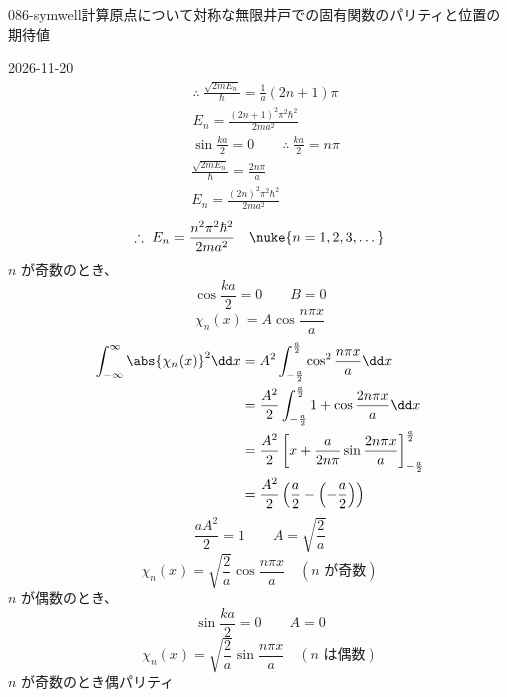 \documentclass[uplatex,dvipdfmx,a4paper,11pt]{jsarticle}
\begin{document}
\begin{mondai}{086-symwell}{計算}{原点について対称な無限井戸での固有関数のパリティと位置の期待値}
\begin{kotaeutsushi}{2026-11-20}
\begin{align*}
&\therefore\ \frac{\sqrt{2mE_{n}}}{\hbar}=\frac{1}{a}(2n+1)\pi\\
&E_{n}=\frac{(2n+1)^{2}\pi^{2}\hbar^{2}}{2ma^{2}}
\end{align*}
\begin{align*}
&\sin\frac{ka}{2}=0\qquad\therefore\ \frac{ka}{2}=n\pi\\
&\frac{\sqrt{2mE_{n}}}{\hbar}=\frac{2n\pi}{a}\\
&E_{n}=\frac{(2n)^{2}\pi^{2}\hbar^{2}}{2ma^{2}}
\end{align*}
\[ \therefore\ E_{n}=\frac{n^{2}\pi^{2}\hbar^{2}}{2ma^{2}}\quad\nuke{n=1,2,3,\dots} \]
$n$ が奇数のとき、
\[ \cos\frac{ka}{2}=0\qquad B=0 \]
\[ \chi_{n}(x)=A\cos\frac{n\pi x}{a} \]
\begin{align*}
\int_{-\infty}^{\infty}\abs{\chi_{n}(x)}^{2}\dd x&=A^{2}\int_{-\frac{a}{2}}^{\frac{a}{2}}\cos^{2}\frac{n\pi x}{a}\dd x\\
&=\frac{A^{2}}{2}\int_{-\frac{a}{2}}^{\frac{a}{2}}1+\cos\frac{2n\pi x}{a}\dd x\\
&=\frac{A^{2}}{2}\left[x+\frac{a}{2n\pi}\sin\frac{2n\pi x}{a}\right]_{-\frac{a}{2}}^{\frac{a}{2}}\\
&=\frac{A^{2}}{2}\left(\frac{a}{2}-\left(-\frac{a}{2}\right)\right)
\end{align*}
\[ \frac{aA^{2}}{2}=1\qquad A=\sqrt{\frac{2}{a}} \]
\[ \chi_{n}(x)=\sqrt{\frac{2}{a}}\cos\frac{n\pi x}{a}\quad(\text{$n$ が奇数}) \]
$n$ が偶数のとき、
\[ \sin\frac{ka}{2}=0\qquad A=0 \]
\[ \chi_{n}(x)=\sqrt{\frac{2}{a}}\sin\frac{n\pi x}{a}\quad(\text{$n$ は偶数}) \]
$n$ が奇数のとき偶パリティ


\end{kotaeutsushi}
\end{mondai}
\end{document}
